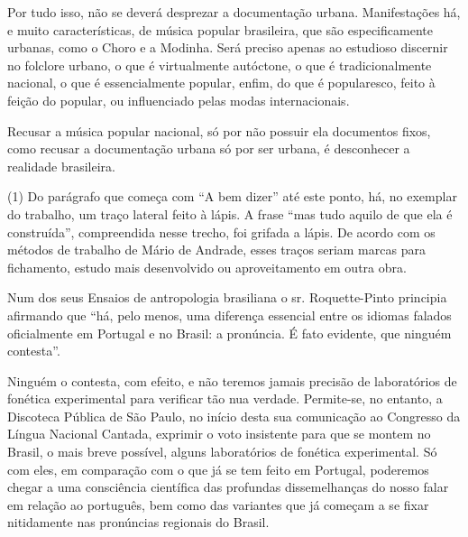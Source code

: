 Por tudo isso, não se deverá desprezar a documentação urbana.
Manifestações há, e muito características, de música popular brasileira,
que são especificamente urbanas, como o Choro e a Modinha. Será preciso
apenas ao estudioso discernir no folclore urbano, o que é virtualmente
autóctone, o que é tradicionalmente nacional, o que é essencialmente
popular, enfim, do que é popularesco, feito à feição do popular, ou
influenciado pelas modas internacionais.

Recusar a música popular nacional, só por não possuir ela documentos
fixos, como recusar a documentação urbana só por ser urbana, é
desconhecer a realidade brasileira.

(1) Do parágrafo que começa com ``A bem dizer'' até este ponto, há, no
exemplar do trabalho, um traço lateral feito à lápis. A frase ``mas tudo
aquilo de que ela é construída'', compreendida nesse trecho, foi grifada
a lápis. De acordo com os métodos de trabalho de Mário de Andrade, esses
traços seriam marcas para fichamento, estudo mais desenvolvido ou
aproveitamento em outra obra.




Num dos seus Ensaios de antropologia brasiliana o sr. Roquette-Pinto
principia afirmando que ``há, pelo menos, uma diferença essencial entre
os idiomas falados oficialmente em Portugal e no Brasil: a pronúncia. É
fato evidente, que ninguém contesta''.

Ninguém o contesta, com efeito, e não teremos jamais precisão de
laboratórios de fonética experimental para verificar tão nua verdade.
Permite-se, no entanto, a Discoteca Pública de São Paulo, no início
desta sua comunicação ao Congresso da Língua Nacional Cantada, exprimir
o voto insistente para que se montem no Brasil, o mais breve possível,
alguns laboratórios de fonética experimental. Só com eles, em comparação
com o que já se tem feito em Portugal, poderemos chegar a uma
consciência científica das profundas dissemelhanças do nosso falar em
relação ao português, bem como das variantes que já começam a se fixar
nitidamente nas pronúncias regionais do Brasil.

